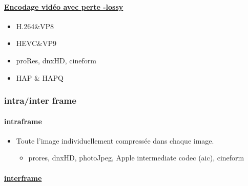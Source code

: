 \documentclass[
]{book}
\providecommand{\tightlist}{%
  \setlength{\itemsep}{0pt}\setlength{\parskip}{0pt}}
\begin{document}
\hypertarget{encodage-viduxe9o-avec-perte--lossy}{%
\paragraph{\texorpdfstring{\href{https://en.wikipedia.org/wiki/List_of_codecs\#Lossy_compression_2}{Encodage vidéo avec perte -lossy}}{Encodage vidéo avec perte -lossy}}\label{encodage-viduxe9o-avec-perte--lossy}}

\begin{itemize}
\tightlist
\item
  H.264\&VP8
\item
  HEVC\&VP9
\item
  proRes, dnxHD, cineform\\
\item
  HAP \& HAPQ
\end{itemize}

\hypertarget{intrainter-frame}{%
\subsubsection{intra/inter frame}\label{intrainter-frame}}

\hypertarget{intraframe}{%
\paragraph{intraframe}\label{intraframe}}

\begin{itemize}
\tightlist
\item
  Toute l'image individuellement compressée dans chaque image.

  \begin{itemize}
  \tightlist
  \item
    prores, dnxHD, photoJpeg, Apple intermediate codec (aic), cineform
  \end{itemize}
\end{itemize}

\hypertarget{interframe}{%
\paragraph{\texorpdfstring{\href{https://en.wikipedia.org/wiki/Inter_frame}{interframe}}{interframe}}\label{interframe}}
\end{document}
